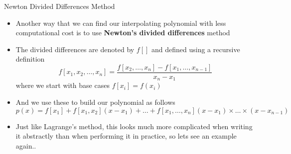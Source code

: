 {}\documentclass[letterpaper,
compress,
xcolor=x11names,
]{beamer}
\begin{document}

\begin{frame}{Newton Divided Differences Method}
	\footnotesize
	\begin{itemize}
		\item Another way that we can find our interpolating polynomial with less computational cost is to use \textbf{Newton's divided differences} method
		\item The divided differences are denoted by $f[]$ and defined using a recursive definition
		\begin{equation*}
			f[x_1, x_2, \dots, x_n] = \frac{f[x_2,\dots,x_n] - f[x_1,\dots,x_{n-1}]}{x_n - x_1}
		\end{equation*}
		where we start with base cases $f[x_i] = f(x_i)$
		\item And we use these to build our polynomial as follows
		\begin{equation*}
			p(x) = f[x_1] + f[x_1,x_2](x-x_1) + \dots + f[x_1,\dots,x_n](x-x_1)\times\dots\times(x-x_{n-1})
		\end{equation*}
		\item Just like Lagrange's method, this looks much more complicated when writing it abstractly than when performing it in practice, so lets see an example again..
	\end{itemize}
\end{frame}

\end{document}
